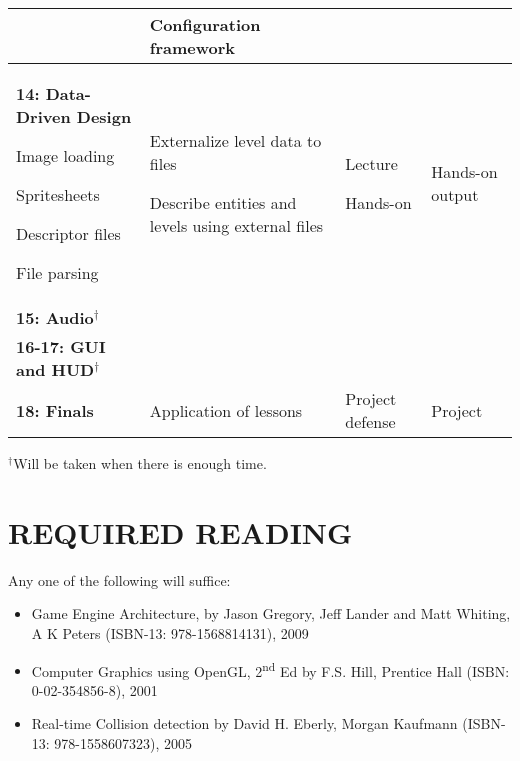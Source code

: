 \documentclass[10pt]{article}
\newenvironment{itemize*}{
\begin{itemize}[leftmargin=1em,noitemsep,nolistsep]
}{\end{itemize}}
\begin{document}
\begin{longtable}{||p{1.8in}|p{2.4in}|p{1.3in}|p{1in}||}
\begin{itemize*}
	\end{itemize*} & Configuration framework \\ \hline
\textbf{14: Data-Driven Design}
	\begin{itemize*}
		\item Image loading
		\item Spritesheets
		\item Descriptor files
		\item File parsing
	\end{itemize*} &
	\begin{itemize*}
		\item Externalize level data to files
		\item Describe entities and levels using external files
	\end{itemize*} &
	\begin{itemize*}
		\item Lecture
		\item Hands-on
	\end{itemize*} & Hands-on output\\ \hline
\textbf{15: Audio$^\dagger$} & & &\\ \hline
\textbf{16-17: GUI and HUD$^\dagger$} & & &\\ \hline
\textbf{18: Finals} & Application of lessons & Project defense & Project \\ \hline
\end{longtable}

$^\dagger$Will be taken when there is enough time.

\section{REQUIRED READING}
Any one of the following will suffice:
\begin{itemize}[noitemsep,nolistsep]
\item Game Engine Architecture, by Jason Gregory, Jeff Lander and Matt Whiting, A K Peters (ISBN-13: 978-1568814131), 2009
\item Computer Graphics using OpenGL, 2\textsuperscript{nd} Ed by F.S. Hill, Prentice Hall (ISBN: 0-02-354856-8), 2001
\item Real-time Collision detection by David H. Eberly, Morgan Kaufmann (ISBN-13: 978-1558607323), 2005
\end{itemize}
\end{document}
